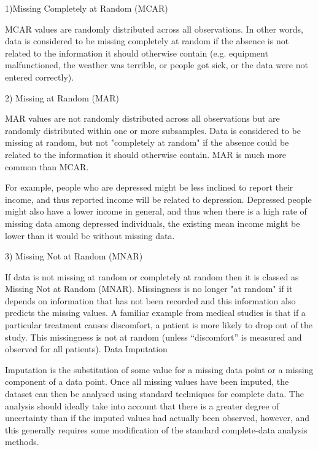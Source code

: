 1)Missing Completely at Random (MCAR)
			
MCAR values are randomly distributed across all observations. In other words, data is considered to be missing completely at random if the absence is not related to the information it should otherwise contain (e.g. equipment malfunctioned, the weather was terrible, or people got sick, or the data were not entered correctly). 

2) Missing at Random (MAR)

MAR values are not randomly distributed across all observations but are randomly distributed within one or more subsamples. Data is considered to be missing at random, but not "completely at random" if the absence could be related to the information it should otherwise contain. MAR is much more common than MCAR.

For example, people who are depressed might be less inclined to report their income, and thus reported income will be related to depression. Depressed people might also have a lower income in general, and thus when there is a high rate of missing data among depressed individuals, the existing mean income might be lower than it would be without missing data. 

3) Missing Not at Random (MNAR)

If data is not missing at random or completely at random then it is classed as Missing Not at Random (MNAR). Missingness is no longer "at random" if it depends on information that has not been recorded and this information also predicts the missing values. 
A familiar example from medical studies is that if a particular treatment causes discomfort, a patient is more likely to drop out of the study. This missingness is not at random (unless “discomfort” is measured and observed for all patients).
Data Imputation

Imputation is the substitution of some value for a missing data point or a missing component of a data point. Once all missing values have been imputed, the dataset can then be analysed using standard techniques for complete data. The analysis should ideally take into account that there is a greater degree of uncertainty than if the imputed values had actually been observed, however, and this generally requires some modification of the standard complete-data analysis methods. 


